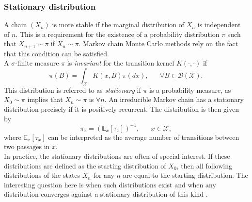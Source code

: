 \subsubsection{Stationary distribution} 
A chain $\left(X_n\right)$ is more stable if the marginal distribution of $X_n$ is independent of $n$. This is a requirement for the existence of a probability distribution $\pi$ such that $X_{n+1}\sim\pi$ if $X_n\sim\pi$. Markov chain Monte Carlo methods rely on the fact that this condition can be satisfied. \\
A $\sigma$-finite measure $\pi$ is \textit{invariant} for the transition kernel $K\left(\cdot,\cdot\right)$ if \begin{equation*}
    \pi\left(B\right)=\int_\mathcal{X}K\left(x,B\right)\pi(dx), \hspace{20pt} \forall B\in\mathcal{B}\left(\mathcal{X}\right).
\end{equation*}
This distribution is referred to as \textit{stationary} if $\pi$ is a probability measure, as $X_0\sim\pi$ implies that $X_n\sim\pi$ is $\forall n$. An irreducible Markov chain has a stationary distribution precisely if it is positively recurrent. The distribution is then given by
\begin{equation}
    \pi_x=\left(\mathbb{E}_x\left[\tau_x\right]\right)^{-1}, \hspace{20pt} x\in\mathcal{X},
\end{equation}
where $\mathbb{E}_x\left[\tau_x\right]$ can be interpreted as the average number of transitions between two passages in $x$. \\
In practice, the stationary distributions are often of special interest. If these distributions are defined as the starting distribution of $X_0$, then all following distributions of the states $X_n$ for any $n$ are equal to the starting distribution. The interesting question here is when such distributions exist and when any distribution converges against a stationary distribution of this kind \autocite[][223--224]{robert2013monte}.
